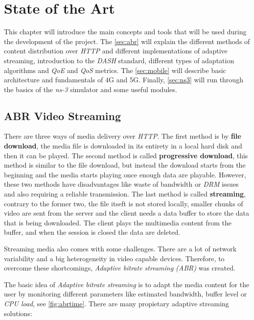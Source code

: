 \chapter{State of the Art}
\label{chap:soa}

This chapter will introduce the main concepts and tools that will be used during the development 
of the project. The \autoref{sec:abr} will explain the different methods of content distribution 
over \textit{HTTP} and different implementations of adaptive streaming, introduction to 
the \textit{DASH} standard, different types of adaptation algorithms and \textit{QoE} and 
\textit{QoS} metrics. The \autoref{sec:mobile} will describe basic architecture and fundamentals
of 4G and 5G. Finally, \autoref{sec:ns3} will run through the basics of the \textit{ns-3}
simulator and some useful modules.

\section{ABR Video Streaming}
\label{sec:abr}

There are three ways of media delivery over \textit{HTTP}. The first method is by
\textbf{file download}, the media file is downloaded in its entirety in a local hard disk and 
then it can be played. The second method is called \textbf{progressive download}, this method
is similar to the file download, but instead the download starts from the beginning and the 
media starts playing once enough data are playable. 
However, these two methods have disadvantages like waste of bandwidth or
\textit{DRM} issues and also requiring a reliable transmission. The last method is called
\textbf{streaming}, contrary to the former two, the file itseft is not stored locally, 
smaller chunks of video are sent from the server and the client needs a data buffer to store 
the data that is being downloaded. The client plays the multimedia content from the 
buffer, and when the session is closed the data are deleted.

Streaming media also comes with some challenges. There are a lot of network variability
and a big heterogeneity in video capable devices. Therefore, to overcome these shortcomings,
\textit{Adaptive bitrate streaming (ABR)} was created.

The basic idea of \textit{Adaptive bitrate streaming} is to adapt the media content
for the user by monitoring different parameters like estimated bandwidth, buffer level or
\textit{CPU load}, see \autoref{fig:abrtime}. There are many propietary adaptive streaming solutions:

